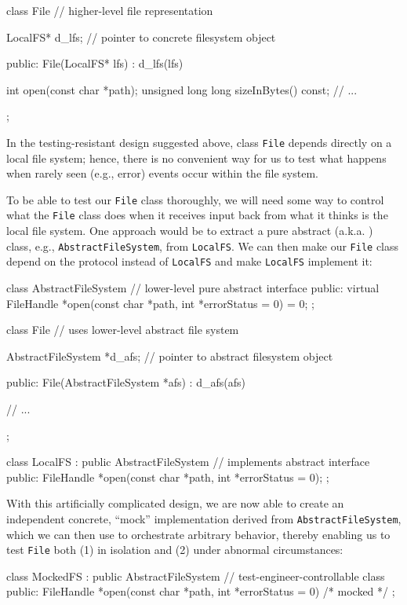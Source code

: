 {{\begin{emcppslisting}
class File  // higher-level file representation
{
    LocalFS* d_lfs;  // pointer to concrete filesystem object

public:
    File(LocalFS* lfs) : d_lfs(lfs) { }

    int open(const char *path);
    unsigned long long sizeInBytes() const;
    // ...
};
\end{emcppslisting}
    

\noindent In the testing-resistant design suggested above, class \lstinline!File!
depends directly on a local file system; hence, there is no convenient
way for us to test what happens when rarely seen (e.g., error) events
occur within the file system.

To be able to test our \lstinline!File! class thoroughly, we will need some
way to control what the \lstinline!File! class does when it receives input
back from what it thinks is the local file system. One approach would be
to extract a pure abstract (a.k.a. ) class, e.g.,
\lstinline!AbstractFileSystem!, from \lstinline!LocalFS!. We can then make our
\lstinline!File! class depend on the protocol instead of \lstinline!LocalFS!
and make \lstinline!LocalFS! implement it:

\begin{emcppslisting}
class AbstractFileSystem  // lower-level pure abstract interface
{
public:
    virtual FileHandle *open(const char *path, int *errorStatus = 0) = 0;
};


class File  // uses lower-level abstract file system
{
    AbstractFileSystem *d_afs;  // pointer to abstract filesystem object

public:
    File(AbstractFileSystem *afs) : d_afs(afs) { }

    // ...
};

class LocalFS : public AbstractFileSystem  // implements abstract interface
{
public:
    FileHandle *open(const char *path, int *errorStatus = 0);
};
\end{emcppslisting}
    

\noindent With this artificially complicated design, we are now able to create an
independent concrete, ``mock'' implementation derived from
\lstinline!AbstractFileSystem!, which we can then use to orchestrate
arbitrary behavior, thereby enabling us to test \lstinline!File! both (1)
in isolation and (2) under abnormal circumstances:

\begin{emcppslisting}
class MockedFS : public AbstractFileSystem  // test-engineer-controllable class
{
public:
    FileHandle *open(const char *path, int *errorStatus = 0) { /* mocked */ }
};


\end{emcppslisting}}}
